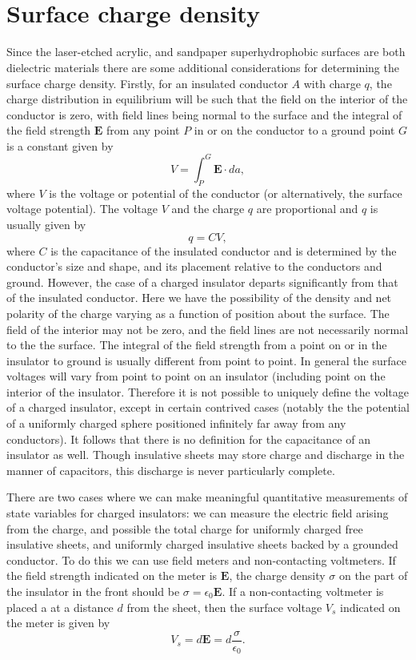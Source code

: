 \documentclass[a4paper, 12pt]{article}
\begin{document}
\section{\\Surface charge density}\label{sec.surface_charge}
Since the laser-etched acrylic, and sandpaper superhydrophobic surfaces are both dielectric materials there are some additional considerations for determining the surface charge density. Firstly, for an insulated conductor $A$ with charge $q$, the charge distribution in equilibrium will be such that the field on the interior of the conductor is zero, with field lines being normal to the surface and the integral of the field strength $\mathbf{E}$ from any point $P$ in or on the conductor to a ground point $G$ is a constant given by
\[ V = \int^G_P \mathbf{E} \cdot da, \]
where $V$ is the voltage or potential of the conductor (or alternatively, the surface voltage potential). The voltage $V$ and the charge $q$ are proportional and $q$ is usually given by
\[q = CV, \]
where $C$ is the capacitance of the insulated conductor and is determined by the conductor's size and shape, and its placement relative to the conductors and ground. However, the case of a charged insulator departs significantly from that of the insulated conductor. Here we have the possibility of the density and net polarity of the charge varying as a function of position about the surface. The field of the interior may not be zero, and the field lines are not necessarily normal to the the surface. The integral of the field strength from a point on or in the insulator to ground is usually different from point to point. In general the surface voltages will vary from point to point on an insulator (including point on the interior of the insulator. Therefore it is not possible to uniquely define the voltage of a charged insulator, except in certain contrived cases (notably the the potential of a uniformly charged sphere positioned infinitely far away from any conductors). It follows that there is no definition for the capacitance of an insulator as well. Though insulative sheets may store charge and discharge in the manner of capacitors, this discharge is never particularly complete.

There are two cases where we can make meaningful quantitative measurements of state variables for charged insulators: we can measure the electric field arising from the charge, and possible the total charge for uniformly charged free insulative sheets, and uniformly charged insulative sheets backed by a grounded conductor. To do this we can use field meters and non-contacting voltmeters. If the field strength indicated on the meter is $\mathbf{E}$, the charge density $\sigma$ on the part of the insulator in the front should be $\sigma = \epsilon_0 \mathbf{E}$. If a non-contacting voltmeter is placed a at a distance $d$ from the sheet, then the surface voltage $V_s$ indicated on the meter is given by 
\[V_s = d \mathbf{E} = d \frac{\sigma}{\epsilon_0}. \]
\end{document}
